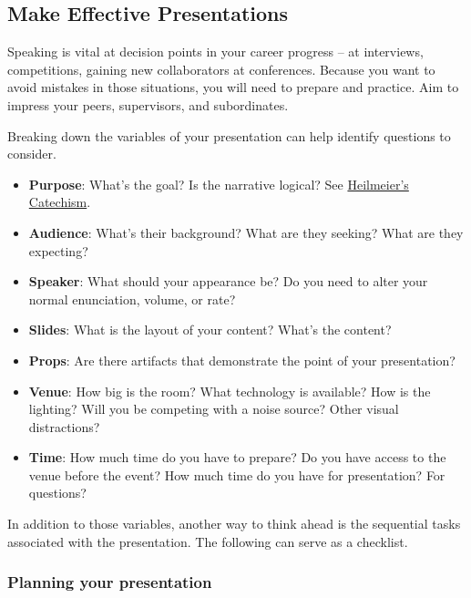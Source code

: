 \subsection*{Make Effective Presentations\label{sec:effective-presentations}}


Speaking is vital at decision points in your career progress -- at interviews, competitions, gaining new collaborators at conferences. 
Because you want to avoid mistakes in those situations, you will need to prepare and practice.
Aim to impress your peers, supervisors, and subordinates. 

Breaking down the variables of your presentation can help identify questions to consider. 
\begin{itemize}
    \item \textbf{Purpose}: What's the goal? Is the narrative logical? See \href{https://en.wikipedia.org/wiki/George_H._Heilmeier#Heilmeier's_Catechism}{Heilmeier's Catechism}.
    \item \textbf{Audience}: What's their background? What are they seeking? What are they expecting?
    \item \textbf{Speaker}: What should your appearance be? Do you need to alter your normal enunciation, volume, or rate?
    \item \textbf{Slides}: What is the layout of your content? What's the content? 
    \item \textbf{Props}: Are there artifacts that demonstrate the point of your presentation?
    \item \textbf{Venue}: How big is the room? What technology is available? How is the lighting? Will you be competing with a noise source? Other visual distractions?
    \item \textbf{Time}: How much time do you have to prepare? Do you have access to the venue before the event? How much time do you have for presentation? For questions?
\end{itemize}

In addition to those variables, another way to think ahead is the sequential tasks associated with the presentation. 
The following can serve as a checklist.

\subsubsection*{Planning your presentation}

